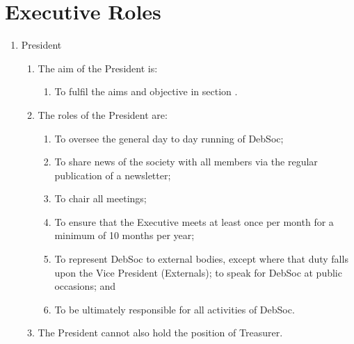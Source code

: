 \newpage
\section{Executive Roles}
\begin{enumerate}
\item President
  \begin{enumerate}
  \item The aim of the President is:
    \begin{enumerate}
    \item To fulfil the aims and objective in section .
    \end{enumerate}
  \item The roles of the President are:
    \begin{enumerate}
    \item To oversee the general day to day running of DebSoc;
    \item To share news of the society with all members via the regular publication of a newsletter;
    \item To chair all meetings;
    \item To ensure that the Executive meets at least once per month for a minimum of 10 months per year;
    \item To represent DebSoc to external bodies, except where that duty falls upon the Vice President (Externals); to speak for DebSoc at public occasions; and
    \item To be ultimately responsible for all activities of DebSoc.
    \end{enumerate}
  \item The President cannot also hold the position of Treasurer.
  \end{enumerate}


\end{enumerate}
